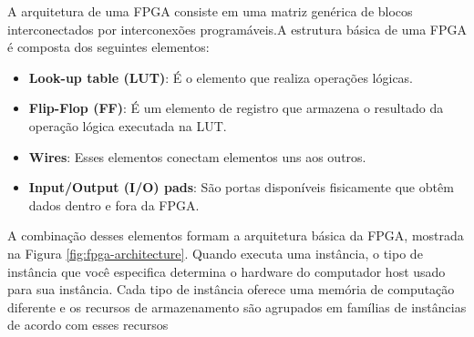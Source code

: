 A arquitetura de uma FPGA consiste em uma matriz genérica de blocos interconectados por interconexões programáveis.A estrutura básica de uma FPGA é composta dos seguintes elementos:
\begin{itemize}
    
    \item \textbf{Look-up table (LUT)}: É o elemento que realiza operações lógicas. 

    \item \textbf{Flip-Flop (FF)}:  É um elemento de registro que armazena o resultado da operação lógica executada na LUT. 

    \item \textbf{Wires}: Esses elementos conectam elementos uns aos outros.

    \item \textbf{Input/Output (I/O) pads}: São portas disponíveis fisicamente que obtêm dados dentro e fora da FPGA.
\end{itemize}

A combinação desses elementos formam a arquitetura básica da FPGA, mostrada na Figura \ref{fig:fpga-architecture}.
Quando executa uma instância, o tipo de instância que você especifica determina o hardware do computador host usado para sua instância. Cada tipo de instância oferece uma memória de computação diferente e os recursos de armazenamento são agrupados em famílias de instâncias de acordo com esses recursos



\begin{figure}[h!] 
   	    \captionsetup{width=16cm}%
	\end{figure}

